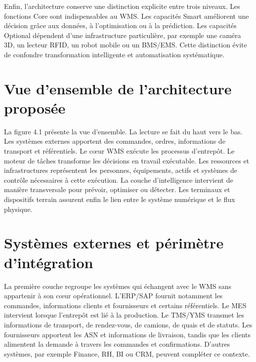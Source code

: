 Enfin, l’architecture conserve une distinction explicite entre trois niveaux. Les fonctions Core sont indispensables au WMS. Les capacités Smart améliorent une décision grâce aux données, à l’optimisation ou à la prédiction. Les capacités Optional dépendent d’une infrastructure particulière, par exemple une caméra 3D, un lecteur RFID, un robot mobile ou un BMS/EMS. Cette distinction évite de confondre transformation intelligente et automatisation systématique.



\section{Vue d’ensemble de l’architecture proposée}

\label{sec:4.2}

La figure 4.1 présente la vue d’ensemble. La lecture se fait du haut vers le bas. Les systèmes externes apportent des commandes, ordres, informations de transport et référentiels. Le cœur WMS exécute les processus d’entrepôt. Le moteur de tâches transforme les décisions en travail exécutable. Les ressources et infrastructures représentent les personnes, équipements, actifs et systèmes de contrôle nécessaires à cette exécution. La couche d’intelligence intervient de manière transversale pour prévoir, optimiser ou détecter. Les terminaux et dispositifs terrain assurent enfin le lien entre le système numérique et le flux physique.




\section{Systèmes externes et périmètre d’intégration}

\label{sec:4.3}

La première couche regroupe les systèmes qui échangent avec le WMS sans appartenir à son cœur opérationnel. L’ERP/SAP fournit notamment les commandes, informations clients et fournisseurs et certains référentiels. Le MES intervient lorsque l’entrepôt est lié à la production. Le TMS/YMS transmet les informations de transport, de rendez-vous, de camions, de quais et de statuts. Les fournisseurs apportent les ASN et informations de livraison, tandis que les clients alimentent la demande à travers les commandes et confirmations. D’autres systèmes, par exemple Finance, RH, BI ou CRM, peuvent compléter ce contexte.


